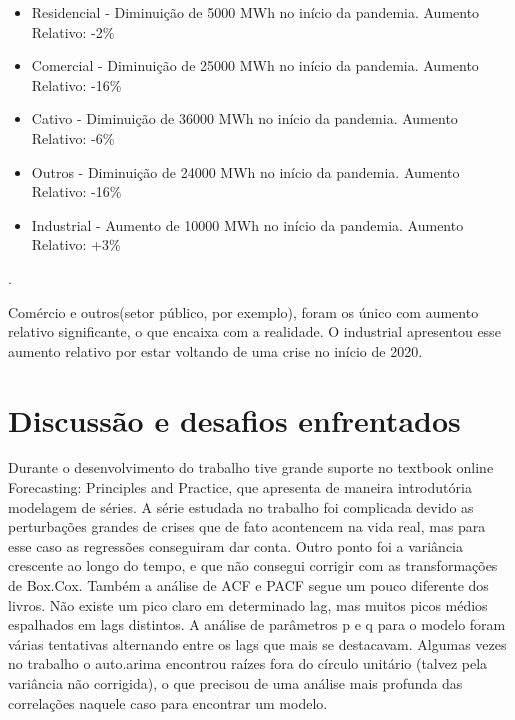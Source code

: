 \documentclass[10pt,a4paper]{article}
\begin{document}
\begin{itemize}
\item Residencial - Diminuição de 5000 MWh no início da pandemia. Aumento Relativo: -2\%
\item Comercial - Diminuição de 25000 MWh no início da pandemia. Aumento Relativo: -16\%
\item Cativo - Diminuição de 36000 MWh no início da pandemia. Aumento Relativo: -6\%
\item Outros - Diminuição de 24000 MWh no início da pandemia. Aumento Relativo: -16\%
\item Industrial - Aumento de 10000 MWh no início da pandemia. Aumento Relativo: +3\%
\end{itemize}. 

Comércio e outros(setor público, por exemplo), foram os único com aumento relativo significante, o que encaixa com a realidade. O industrial apresentou esse aumento relativo por estar voltando de uma crise no início de 2020.

\section{Discussão e desafios enfrentados}

Durante o desenvolvimento do trabalho tive grande suporte no textbook online Forecasting: Principles and Practice, que apresenta de maneira introdutória modelagem de séries. A série estudada no trabalho foi complicada devido as perturbações grandes de crises que de fato acontencem na vida real, mas para esse caso as regressões conseguiram dar conta. Outro ponto foi a variância crescente ao longo do tempo, e que não consegui corrigir com as transformações de Box.Cox. Também a análise de ACF e PACF segue um pouco diferente dos livros. Não existe um pico claro em determinado lag, mas muitos picos médios espalhados em lags distintos. A análise de parâmetros p e q para o modelo foram várias tentativas alternando entre os lags que mais se destacavam. Algumas vezes no trabalho o auto.arima encontrou raízes fora do círculo unitário (talvez pela variância não corrigida), o que precisou de uma análise mais profunda das correlações naquele caso para encontrar um modelo.
\end{document}

